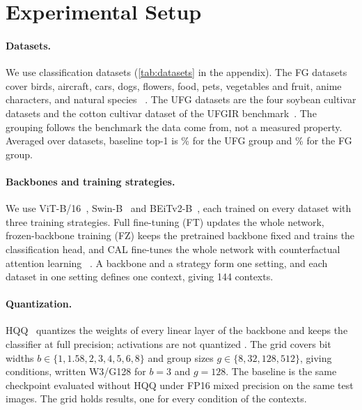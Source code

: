 \section{Experimental Setup}
\label{sec:setup}

\paragraph{Datasets.}
We use  classification datasets (\cref{tab:datasets} in the appendix).
The  FG datasets cover birds, aircraft, cars, dogs, flowers, food, pets, vegetables and fruit, anime characters, and natural species~\cite{wah2011cub,vanhorn2015nabirds,maji2013fine,krause2013cars,khosla2011dogs,nilsback2008flowers,bossard2014food,parkhi2012pets,hou2017vegfru,vanhorn2018inat} .
The  UFG datasets are the four soybean cultivar datasets and the cotton cultivar dataset of the UFGIR benchmark~\cite{yu2021benchmark}.
The grouping follows the benchmark the data come from, not a measured property.
Averaged over datasets, baseline top-1 is \% for the UFG group and \% for the FG group.

\paragraph{Backbones and training strategies.}
We use ViT-B/16~\cite{dosovitskiy2021vit}, Swin-B~\cite{liu2021swin} and BEiTv2-B~\cite{peng2022beitv2}, each trained on every dataset with three training strategies.
Full fine-tuning (FT) updates the whole network, frozen-backbone training (FZ) keeps the pretrained backbone fixed and trains the classification head, and CAL fine-tunes the whole network with counterfactual attention learning~\cite{rao2021cal} .
A backbone and a strategy form one setting, and each dataset in one setting defines one context, giving 144 contexts.

\paragraph{Quantization.}
HQQ~\cite{badri2023hqq} quantizes the weights of every linear layer of the backbone and keeps the classifier at full precision; activations are not quantized .
The grid covers bit widths $b \in \{1, 1.58, 2, 3, 4, 5, 6, 8\}$ and group sizes $g \in \{8, 32, 128, 512\}$, giving  conditions, written W3/G128 for $b=3$ and $g=128$.
The baseline is the same checkpoint evaluated without HQQ under FP16 mixed precision on the same test images.
The grid holds  results, one for every condition of the  contexts.

